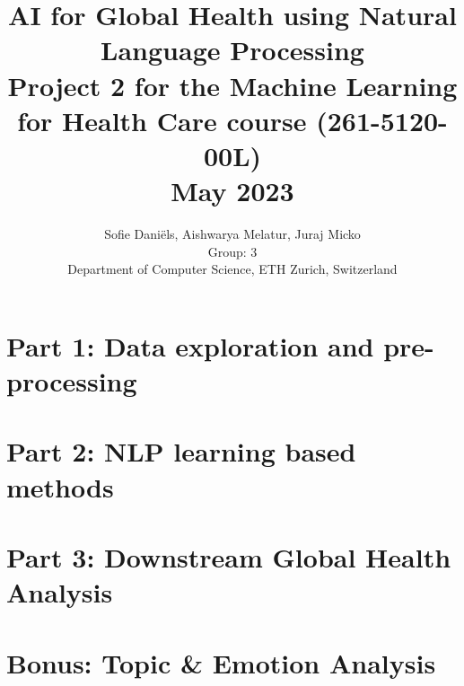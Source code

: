 \documentclass[journal,10pt,onecolumn,compsocconf,]{IEEEtran}
\title{AI for Global Health using Natural Language Processing \\
\normalsize Project 2 for the Machine Learning for Health Care course (261-5120-00L) \\ \vspace*{20pt}
May 2023
}
\author{
  Sofie Daniëls, Aishwarya Melatur, Juraj Micko\\
  Group: 3 \\
  Department of Computer Science, ETH Zurich, Switzerland
}
\begin{document}
\maketitle
\thispagestyle{plain}
\pagestyle{plain}




\section*{\large Part 1: Data exploration and pre-processing}

\clearpage 
\section*{\large Part 2: NLP learning based methods}

\clearpage 

\clearpage 

\clearpage 
\section*{\large Part 3: Downstream Global Health Analysis}

\clearpage 
\section*{\large Bonus: Topic \& Emotion Analysis}


\clearpage

\printbibliography[heading=references]
\end{document}
